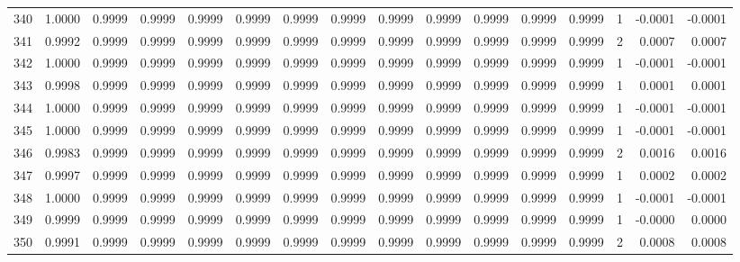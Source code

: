 \begin{tabular}{lrrrrrrrrrrrrrrr}
340 &      1.0000 &  0.9999 &  0.9999 &  0.9999 &  0.9999 &  0.9999 &  0.9999 &  0.9999 &  0.9999 &  0.9999 &   0.9999 &     0.9999 &      1 &                   -0.0001 &                    -0.0001 \\
341 &      0.9992 &  0.9999 &  0.9999 &  0.9999 &  0.9999 &  0.9999 &  0.9999 &  0.9999 &  0.9999 &  0.9999 &   0.9999 &     0.9999 &      2 &                    0.0007 &                     0.0007 \\
342 &      1.0000 &  0.9999 &  0.9999 &  0.9999 &  0.9999 &  0.9999 &  0.9999 &  0.9999 &  0.9999 &  0.9999 &   0.9999 &     0.9999 &      1 &                   -0.0001 &                    -0.0001 \\
343 &      0.9998 &  0.9999 &  0.9999 &  0.9999 &  0.9999 &  0.9999 &  0.9999 &  0.9999 &  0.9999 &  0.9999 &   0.9999 &     0.9999 &      1 &                    0.0001 &                     0.0001 \\
344 &      1.0000 &  0.9999 &  0.9999 &  0.9999 &  0.9999 &  0.9999 &  0.9999 &  0.9999 &  0.9999 &  0.9999 &   0.9999 &     0.9999 &      1 &                   -0.0001 &                    -0.0001 \\
345 &      1.0000 &  0.9999 &  0.9999 &  0.9999 &  0.9999 &  0.9999 &  0.9999 &  0.9999 &  0.9999 &  0.9999 &   0.9999 &     0.9999 &      1 &                   -0.0001 &                    -0.0001 \\
346 &      0.9983 &  0.9999 &  0.9999 &  0.9999 &  0.9999 &  0.9999 &  0.9999 &  0.9999 &  0.9999 &  0.9999 &   0.9999 &     0.9999 &      2 &                    0.0016 &                     0.0016 \\
347 &      0.9997 &  0.9999 &  0.9999 &  0.9999 &  0.9999 &  0.9999 &  0.9999 &  0.9999 &  0.9999 &  0.9999 &   0.9999 &     0.9999 &      1 &                    0.0002 &                     0.0002 \\
348 &      1.0000 &  0.9999 &  0.9999 &  0.9999 &  0.9999 &  0.9999 &  0.9999 &  0.9999 &  0.9999 &  0.9999 &   0.9999 &     0.9999 &      1 &                   -0.0001 &                    -0.0001 \\
349 &      0.9999 &  0.9999 &  0.9999 &  0.9999 &  0.9999 &  0.9999 &  0.9999 &  0.9999 &  0.9999 &  0.9999 &   0.9999 &     0.9999 &      1 &                   -0.0000 &                     0.0000 \\
350 &      0.9991 &  0.9999 &  0.9999 &  0.9999 &  0.9999 &  0.9999 &  0.9999 &  0.9999 &  0.9999 &  0.9999 &   0.9999 &     0.9999 &      2 &                    0.0008 &                     0.0008 \\

\end{tabular}
